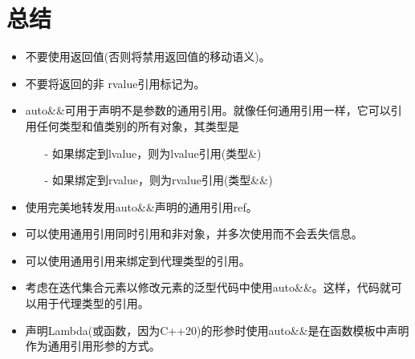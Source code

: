 \section{总结}
\begin{itemize}
	\item 不要使用返回值(否则将禁用返回值的移动语义)。
	\item 不要将返回的非 rvalue引用标记为。
	\item auto\&\&可用于声明不是参数的通用引用。就像任何通用引用一样，它可以引用任何类型和值类别的所有对象，其类型是
	\begin{itemize}
		\item[-] 如果绑定到lvalue，则为lvalue引用(类型\&)
		\item[-] 如果绑定到rvalue，则为rvalue引用(类型\&\&)
	\end{itemize}
	\item 使用完美地转发用auto\&\&声明的通用引用ref。
	\item 可以使用通用引用同时引用和非对象，并多次使用而不会丢失信息。
	\item 可以使用通用引用来绑定到代理类型的引用。
	\item 考虑在迭代集合元素以修改元素的泛型代码中使用auto\&\&。这样，代码就可以用于代理类型的引用。
	\item 声明Lambda(或函数，因为C++20)的形参时使用auto\&\&是在函数模板中声明作为通用引用形参的方式。
\end{itemize}


